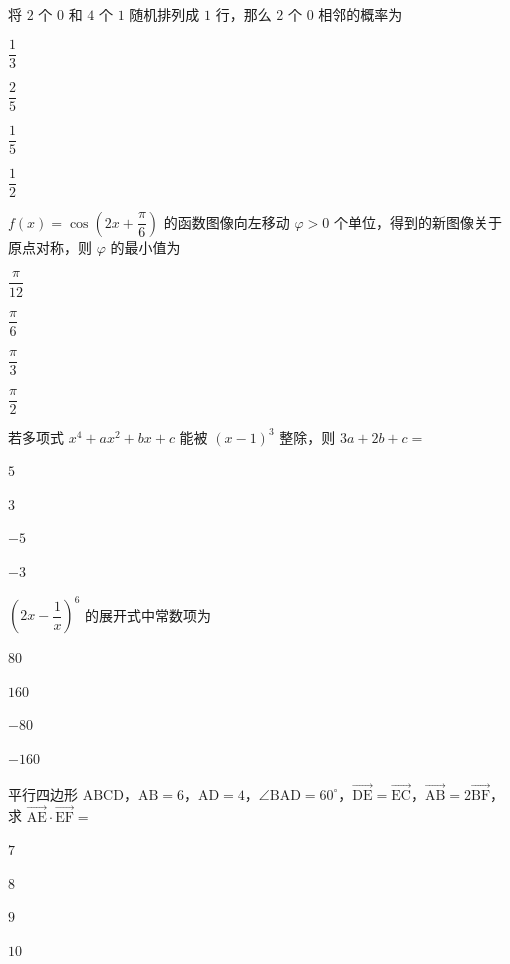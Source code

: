 \documentclass{exam-zh}
\begin{document}
\begin{question}
将 $2$ 个 $0$ 和 $4$ 个 $1$ 随机排列成 $1$ 行，那么 $2$ 个 $0$ 相邻的概率为 \paren[]
\begin{choices}
  \item $\dfrac{1}{3}$
  \item $\dfrac{2}{5}$
  \item $\dfrac{1}{5}$
  \item $\dfrac{1}{2}$
\end{choices}
\end{question}

\begin{question}
$f(x)=\cos\left(2x+\dfrac{\pi}{6}\right)$ 的函数图像向左移动 $\varphi>0$ 个单位，得到的新图像关于原点对称，则 $\varphi$ 的最小值为 \paren[]
\begin{choices}
  \item $\dfrac{\pi}{12}$
  \item $\dfrac{\pi}{6}$
  \item $\dfrac{\pi}{3}$
  \item $\dfrac{\pi}{2}$
\end{choices}
\end{question}

\begin{question}
若多项式 $x^4+ax^2+bx+c$ 能被 $(x-1)^3$ 整除，则 $3a+2b+c=$ \paren[]
\begin{choices}
  \item $5$
  \item $3$
  \item $-5$
  \item $-3$
\end{choices}
\end{question}

\begin{question}
$\left(2x-\dfrac{1}{x}\right)^6$ 的展开式中常数项为 \paren[]
\begin{choices}
  \item $80$
  \item $160$
  \item $-80$
  \item $-160$
\end{choices}
\end{question}

\begin{question}
平行四边形 $\mathrm{ABCD}$，$\mathrm{AB}=6$，$\mathrm{AD}=4$，$\angle \mathrm{BAD}=60^\circ$，$\overrightarrow{\mathrm{DE}}=\overrightarrow{\mathrm{EC}}$，$\overrightarrow{\mathrm{AB}}=2\overrightarrow{\mathrm{BF}}$，求 $\overrightarrow{\mathrm{AE}}\cdot\overrightarrow{\mathrm{EF}}=$ \paren[]
\begin{choices}
  \item $7$
  \item $8$
  \item $9$
  \item $10$
\end{choices}
\end{question}
\end{document}
